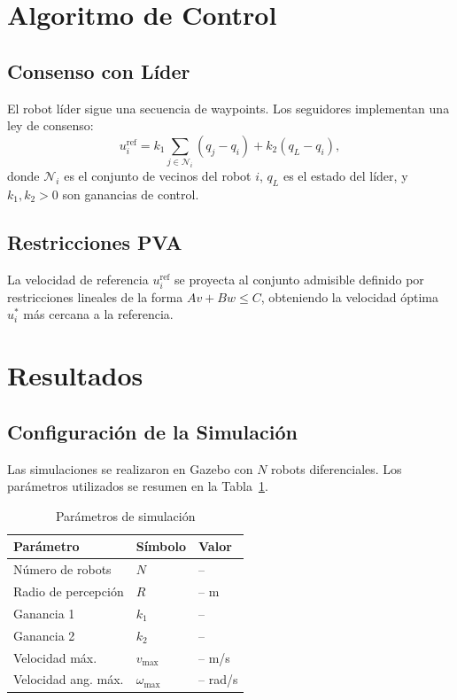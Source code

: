 \documentclass[conference]{IEEEtran}
\begin{document}
\section{Algoritmo de Control}

\subsection{Consenso con Líder}

El robot líder sigue una secuencia de waypoints. Los seguidores implementan una ley de consenso:
\begin{equation}
  u_i^{\text{ref}} = k_1 \sum_{j \in \mathcal{N}_i} (q_j - q_i) + k_2 (q_L - q_i),
  \label{eq:consenso_lider}
\end{equation}
donde $\mathcal{N}_i$ es el conjunto de vecinos del robot $i$, $q_L$ es el estado del líder, y $k_1, k_2 > 0$ son ganancias de control.

\subsection{Restricciones PVA}

La velocidad de referencia $u_i^{\text{ref}}$ se proyecta al conjunto admisible definido por restricciones lineales de la forma $Av + Bw \leq C$, obteniendo la velocidad óptima $u_i^*$ más cercana a la referencia.

\section{Resultados}

\subsection{Configuración de la Simulación}

Las simulaciones se realizaron en Gazebo con $N$ robots diferenciales. Los parámetros utilizados se resumen en la Tabla~\ref{tab:params}.

\begin{table}[h]
  \centering
  \caption{Parámetros de simulación}
  \label{tab:params}
  \begin{tabular}{lll}
    \toprule
    Parámetro & Símbolo & Valor \\
    \midrule
    Número de robots    & $N$     & -- \\
    Radio de percepción & $R$     & -- m \\
    Ganancia 1          & $k_1$   & -- \\
    Ganancia 2          & $k_2$   & -- \\
    Velocidad máx.      & $v_{\max}$ & -- m/s \\
    Velocidad ang. máx. & $\omega_{\max}$ & -- rad/s \\
    \bottomrule
  \end{tabular}
\end{table}
\end{document}
